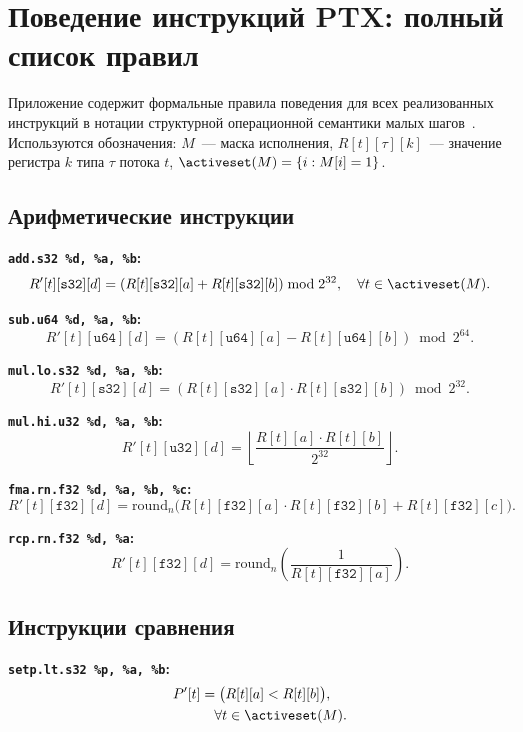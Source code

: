 \section{Поведение инструкций PTX: полный список правил}
\label{app:sos}

Приложение содержит формальные правила поведения для всех реализованных инструкций в нотации структурной операционной семантики малых шагов~\cite{Plotkin1981}. Используются обозначения:
$M$~--- маска исполнения, $R[t][\tau][k]$~--- значение регистра $k$
типа $\tau$ потока $t$, $\activeset(M) = \{i : M[i]=1\}$.

\subsection*{Арифметические инструкции}

\textbf{\texttt{add.s32 \%d, \%a, \%b}:}
\[
  R'[t][\mathtt{s32}][d] =
  (R[t][\mathtt{s32}][a] + R[t][\mathtt{s32}][b]) \bmod 2^{32},
  \quad \forall t \in \activeset(M).
\]

\textbf{\texttt{sub.u64 \%d, \%a, \%b}:}
\[
  R'[t][\mathtt{u64}][d] =
  (R[t][\mathtt{u64}][a] - R[t][\mathtt{u64}][b]) \bmod 2^{64}.
\]

\textbf{\texttt{mul.lo.s32 \%d, \%a, \%b}:}
\[
  R'[t][\mathtt{s32}][d] =
  (R[t][\mathtt{s32}][a] \cdot R[t][\mathtt{s32}][b]) \bmod 2^{32}.
\]

\textbf{\texttt{mul.hi.u32 \%d, \%a, \%b}:}
\[
  R'[t][\mathtt{u32}][d] =
  \left\lfloor \frac{R[t][a] \cdot R[t][b]}{2^{32}} \right\rfloor.
\]

\textbf{\texttt{fma.rn.f32 \%d, \%a, \%b, \%c}:}
\[
  R'[t][\mathtt{f32}][d] =
  \mathrm{round}_n\!\bigl(R[t][\mathtt{f32}][a]
    \cdot R[t][\mathtt{f32}][b]
    + R[t][\mathtt{f32}][c]\bigr).
\]

\textbf{\texttt{rcp.rn.f32 \%d, \%a}:}
\[
  R'[t][\mathtt{f32}][d] =
  \mathrm{round}_n\!\left(\frac{1}{R[t][\mathtt{f32}][a]}\right).
\]

\subsection*{Инструкции сравнения}

\textbf{\texttt{setp.lt.s32 \%p, \%a, \%b}:}
\begin{align*}
  P'[t] &= \bigl(R[t][a] < R[t][b]\bigr), \\
  &\quad \forall t \in \activeset(M).
\end{align*}

